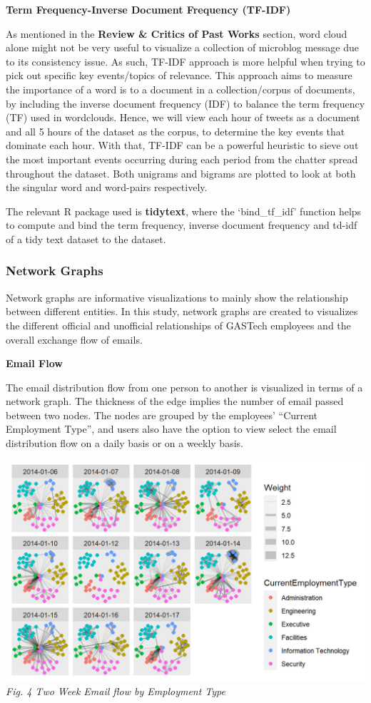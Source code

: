 \documentclass{acm_proc_article-sp}
\begin{document}
\textbf{Term Frequency-Inverse Document Frequency (TF-IDF)}

As mentioned in the \textbf{Review \& Critics of Past Works} section,
word cloud alone might not be very useful to visualize a collection of
microblog message due to its consistency issue. As such, TF-IDF approach
is more helpful when trying to pick out specific key events/topics of
relevance. This approach aims to measure the importance of a word is to
a document in a collection/corpus of documents, by including the inverse
document frequency (IDF) to balance the term frequency (TF) used in
wordclouds. Hence, we will view each hour of tweets as a document and
all 5 hours of the dataset as the corpus, to determine the key events
that dominate each hour. With that, TF-IDF can be a powerful heuristic
to sieve out the most important events occurring during each period from
the chatter spread throughout the dataset. Both unigrams and bigrams are
plotted to look at both the singular word and word-pairs respectively.

The relevant R package used is \textbf{tidytext}, where the
`bind\_tf\_idf' function helps to compute and bind the term frequency,
inverse document frequency and td-idf of a tidy text dataset to the
dataset.

\hypertarget{network-graphs-1}{%
\subsubsection{Network Graphs}\label{network-graphs-1}}

Network graphs are informative visualizations to mainly show the
relationship between different entities. In this study, network graphs
are created to visualizes the different official and unofficial
relationships of GASTech employees and the overall exchange flow of
emails.

\textbf{Email Flow}

The email distribution flow from one person to another is visualized in
terms of a network graph. The thickness of the edge implies the number
of email passed between two nodes. The nodes are grouped by the
employees' ``Current Employment Type'', and users also have the option
to view select the email distribution flow on a daily basis or on a
weekly basis.

\includegraphics{img/image09.png} \emph{Fig. 4 Two Week Email flow by
Employment Type}
\end{document}
